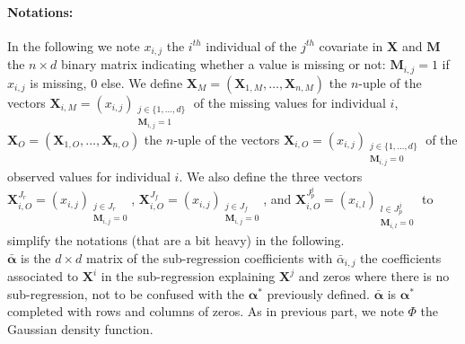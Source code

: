 \documentclass[12pt,a4paper]{report}
\begin{document}
	\paragraph{Notations:} In the following we note $x_{i,j}$ the $i^{th}$ individual of the $j^{th}$ covariate in $\boldsymbol{X}$ and $\boldsymbol{M}$ the $n\times d$ binary matrix indicating whether a value is missing or not: $\boldsymbol{M}_{i,j}=1$ if $x_{i,j}$ is missing, 0 else. 
	We define $\boldsymbol{X}_M=(\boldsymbol{X}_{1,M},\dots,\boldsymbol{X}_{n,M})$ the $n$-uple of the vectors $\boldsymbol{X}_{i,M}=(x_{i,j})_{\substack{j \in \{1,\dots,d \} \\ \boldsymbol{M}_{i,j}=1}}$ of the missing values for individual $i$, $\boldsymbol{X}_O=(\boldsymbol{X}_{1,O},\dots,\boldsymbol{X}_{n,O})$ the $n$-uple of the vectors $\boldsymbol{X}_{i,O}=\left(x_{i,j}\right)_{\substack{j \in \{1,\dots,d \} \\ \boldsymbol{M}_{i,j}=0}}$ of the observed values for individual $i$. %
	We also define the three vectors $\boldsymbol{X}_{i,O}^{J_r}=\left(x_{i,j}\right)_{\substack{j \in J_r \\ \boldsymbol{M}_{i,j}=0}} $, $\boldsymbol{X}_{i,O}^{J_f}=\left(x_{i,j}\right)_{\substack{j \in J_f \\ \boldsymbol{M}_{i,j}=0}} $, and $\boldsymbol{X}_{i,O}^{J_p^j}=\left(x_{i,l}\right)_{\substack{l \in J_p^j \\ \boldsymbol{M}_{i,l}=0}} $ to simplify the notations (that are a bit heavy) in the following.\\
	
	$\bar{\boldsymbol{\alpha}}$ is the $d\times d$ matrix of the sub-regression coefficients with $\bar{\alpha}_{i,j}$ the coefficients associated to $\boldsymbol{X}^i$ in the sub-regression explaining $\boldsymbol{X}^j$ and zeros where there is no sub-regression, not to be confused with the $\boldsymbol{\alpha}^*$ previously defined. $\bar{\boldsymbol{\alpha}}$ is  $\boldsymbol{\alpha}^*$ completed with rows and columns of zeros. As in previous part, we note $\Phi$ the Gaussian density function.\\  
	
	
\end{document}
